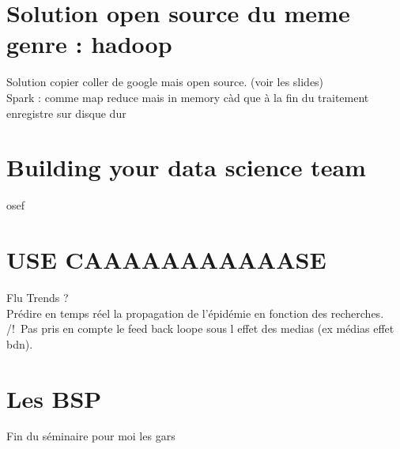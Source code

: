 \documentclass[10pt,a4paper]{article}
\begin{document}
\section{Solution open source du meme genre : hadoop}
Solution copier coller de google mais open source. (voir les slides)
\\Spark : comme map reduce mais in memory càd que à la fin du traitement enregistre sur disque dur
\section{Building your data science team}
osef
\section{USE CAAAAAAAAAAASE}
Flu Trends ?\\ Prédire en temps réel la propagation de l'épidémie en fonction des recherches. /!\ Pas pris en compte le feed back loope sous l effet des medias (ex médias effet bdn).
\section{Les BSP}
Fin du séminaire pour moi les gars
\end{document}
